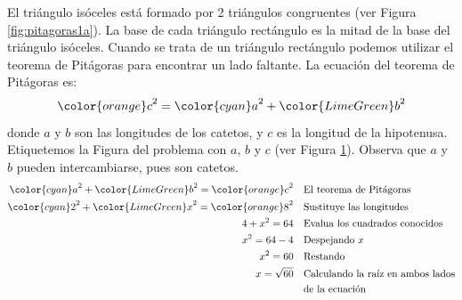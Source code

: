 \begin{solutionbox}{15cm}
\begin{minipage}{0.3\textwidth}
\begin{figure}[H]
            \caption{}
            \label{fig:pitagoras1b}
        \end{figure}
    \end{minipage}\hfill
    \begin{minipage}{0.65\textwidth}
        El triángulo isóceles está formado por 2 triángulos congruentes (ver Figura \ref{fig:pitagoras1a}).
        La base de cada triángulo rectángulo es la mitad de la base del triángulo isóceles.
        Cuando se trata de un triángulo rectángulo podemos utilizar el teorema de Pitágoras para encontrar un lado faltante.
        La ecuación del teorema de Pitágoras es:
        \[{\color{orange}c}^2={\color{cyan}a}^2+{\color{LimeGreen}b}^2\]
        donde $a$ y $b$ son las longitudes de los catetos, y $c$ es la longitud de la hipotenusa.
        Etiquetemos la Figura del problema con $a$, $b$ y $c$ (ver Figura \ref{fig:pitagoras1b}).
        Observa que $a$ y $b$ pueden intercambiarse, pues son catetos.
        \begin{align*}
            {\color{cyan}a}^2+{\color{LimeGreen}b}^2  ={\color{orange}c}^2 & \text{\quad El teorema de Pitágoras}           \\
            {\color{cyan}2}^2+{\color{LimeGreen}x}^2  ={\color{orange}8}^2 & \text{\quad Sustituye las longitudes}          \\
            4+x^2  =64                                                     & \text{\quad Evalua los cuadrados conocidos}    \\
            x^2=64-4                                                       & \text{\quad Despejando } x                     \\
            x^2=60                                                         & \text{\quad Restando}                          \\
            x=\sqrt{60}                                                    & \text{\quad Calculando la raíz en ambos lados} \\
                                                                           & \text{\quad de la ecuación}                    \\
        \end{align*}
    \end{minipage}
\end{solutionbox}
